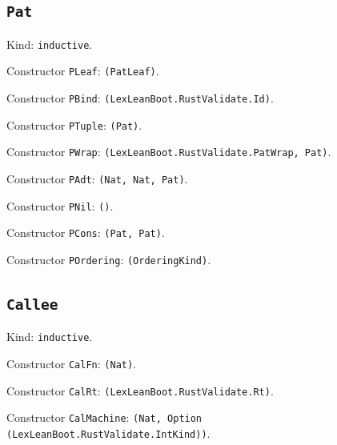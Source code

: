 \documentclass[11pt]{article}
\begin{document}
\subsection*{\texttt{Pat}}
\noindent Kind: \texttt{inductive}.\par
\noindent Constructor \texttt{PLeaf}: \texttt{(PatLeaf)}.\par
\noindent Constructor \texttt{PBind}: \texttt{(LexLeanBoot.RustValidate.Id)}.\par
\noindent Constructor \texttt{PTuple}: \texttt{(Pat)}.\par
\noindent Constructor \texttt{PWrap}: \texttt{(LexLeanBoot.RustValidate.PatWrap, Pat)}.\par
\noindent Constructor \texttt{PAdt}: \texttt{(Nat, Nat, Pat)}.\par
\noindent Constructor \texttt{PNil}: \texttt{()}.\par
\noindent Constructor \texttt{PCons}: \texttt{(Pat, Pat)}.\par
\noindent Constructor \texttt{POrdering}: \texttt{(OrderingKind)}.\par
\subsection*{\texttt{Callee}}
\noindent Kind: \texttt{inductive}.\par
\noindent Constructor \texttt{CalFn}: \texttt{(Nat)}.\par
\noindent Constructor \texttt{CalRt}: \texttt{(LexLeanBoot.RustValidate.Rt)}.\par
\noindent Constructor \texttt{CalMachine}: \texttt{(Nat, Option (LexLeanBoot.RustValidate.IntKind))}.\par
\end{document}
